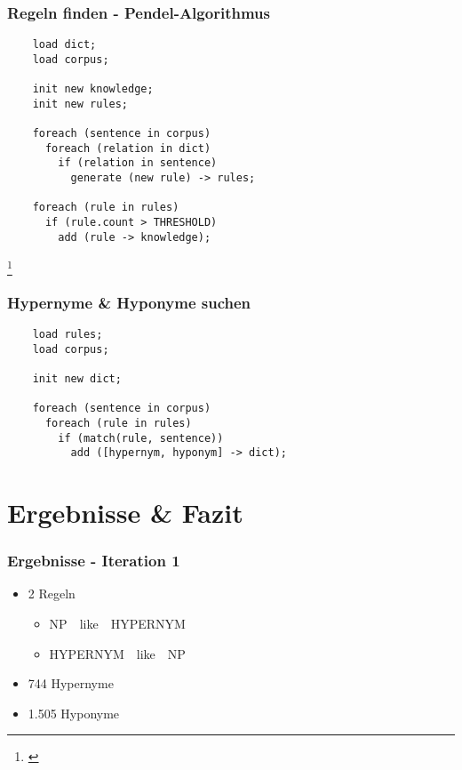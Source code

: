 \begin{frame}[fragile]
  \frametitle{Regeln finden - Pendel-Algorithmus}

  \begin{lstlisting}
    load dict;
    load corpus;
    
    init new knowledge;
    init new rules;

    foreach (sentence in corpus)
      foreach (relation in dict)
        if (relation in sentence)
          generate (new rule) -> rules;

    foreach (rule in rules)
      if (rule.count > THRESHOLD)
        add (rule -> knowledge);
  \end{lstlisting}

  \let\thefootnote\relax\footnote{\cite{Biemann:2003}}
\end{frame}

\begin{frame}[fragile]
  \frametitle{Hypernyme \& Hyponyme suchen}

  \begin{lstlisting}
    load rules;
    load corpus;

    init new dict;

    foreach (sentence in corpus)
      foreach (rule in rules)
        if (match(rule, sentence))
          add ([hypernym, hyponym] -> dict);
  \end{lstlisting}
\end{frame}

\section{Ergebnisse \& Fazit}

\begin{frame}
  \frametitle{Ergebnisse - Iteration 1}

  \begin{itemize}
  \item 2 Regeln
    \begin{itemize}
    \item NP~\textpipe~like~\textpipe~HYPERNYM
    \item HYPERNYM~\textpipe~like~\textpipe~NP
    \end{itemize}

  \item 744 Hypernyme
  \item 1.505 Hyponyme
  \end{itemize}
\end{frame}

